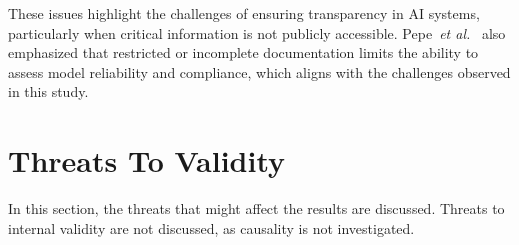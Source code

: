 \documentclass[12pt,a4paper, oneside, openright]{book}
\newcommand{\aibom}{{AIBoM}\xspace}
\newcommand{\aiboms}{{AIBoMs}\xspace}
\newcommand{\etal}{\textit{et al.}\xspace}
\begin{document}
These issues highlight the challenges of ensuring transparency in AI systems, particularly when critical information is not publicly accessible. Pepe~\etal~\cite{How_do_Hugging} also emphasized that restricted or incomplete documentation limits the ability to assess model reliability and compliance, which aligns with the challenges observed in this study.



\section{Threats To Validity}
In this section, the threats that might affect the results are discussed. Threats to internal validity are not discussed, as causality is not investigated.
\end{document}
